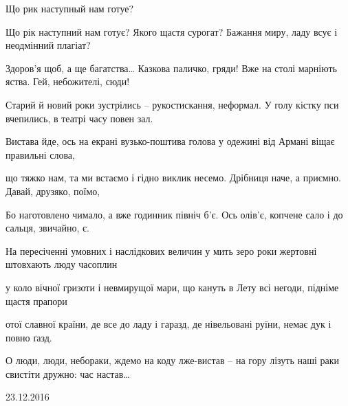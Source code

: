  
 
 

Що рик наступный нам готуе?


Що рік наступний нам готує?
Якого щастя сурогат?
Бажання миру, ладу всує
і неодмінний плагіат?

Здоров’я щоб, а ще багатства…
Казкова паличко, гряди!
Вже на столі марніють яства.
Гей, небожителі, сюди!

Старий й новий роки зустрілись –
рукостискання, неформал.
У голу кістку пси вчепились,
в театрі часу повен зал.

Вистава йде, ось на екрані
вузько-поштива голова
у одежині від Армані
віщає правильні слова,

що тяжко нам, та ми встаємо
і гідно виклик несемо.
Дрібниця наче, а приємно.
Давай, друзяко, поїмо,

Бо наготовлено чимало,
а вже годинник північ б’є.
Ось олів’є, копчене сало
і до сальця, звичайно, є.

На пересіченні умовних
і наслідкових величин
у мить зеро роки жертовні
штовхають люду часоплин

у коло вічної гризоти
і невмирущої мари,
що кануть в Лету всі негоди,
підніме щастя прапори

отої славної країни,
де все до ладу і гаразд,
де нівельовані руїни,
немає дук і повно ґазд.

О люди, люди, небораки,
ждемо на коду лже-вистав –
на гору лізуть наші раки
свистіти дружно: час настав…

23.12.2016 
